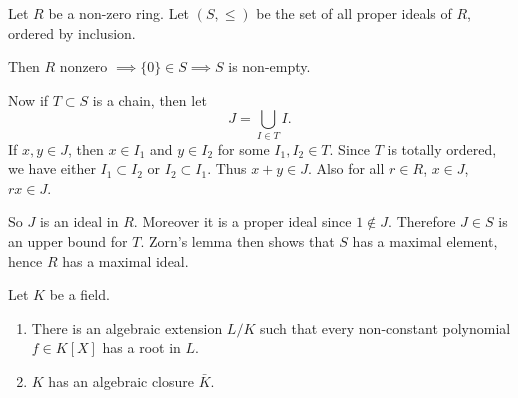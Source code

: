 \documentclass[12pt]{article}
\begin{document}
\begin{exbox}
	Let $R$ be a non-zero ring. Let $(S, \le)$ be the set of all proper ideals of $R$, ordered by inclusion.

	Then $R$ nonzero $\implies \{0\} \in S \implies S$ is non-empty.

	Now if $T \subset S$ is a chain, then let
	\[
	J = \bigcup_{I \in T}I.
	\]
	If $x, y \in J$, then $x \in I_1$ and $y \in I_2$ for some $I_1, I_2 \in T$. Since $T$ is totally ordered, we have either $I_1 \subset I_2$ or $I_2 \subset I_1$. Thus $x + y \in J$. Also for all $r \in R$, $x \in J$, $rx \in J$.

	So $J$ is an ideal in $R$. Moreover it is a proper ideal since $1 \not \in J$. Therefore $J \in S$ is an upper bound for $T$. Zorn's lemma then shows that $S$ has a maximal element, hence $R$ has a maximal ideal.
\end{exbox}

\begin{theorem}
	Let $K$ be a field.
	\begin{enumerate}[\normalfont(i)]
		\item There is an algebraic extension $L/K$ such that every non-constant polynomial $f \in K[X]$ has a root in $L$.
		\item $K$ has an algebraic closure $\bar K$.
	\end{enumerate}	
\end{theorem}
\end{document}
